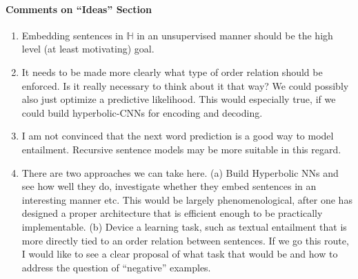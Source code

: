 \documentclass{article}
\begin{document}
\paragraph{Comments on ``Ideas'' Section}
\begin{enumerate}
\item Embedding sentences in $\mathbb H$ in an unsupervised manner should be the high level (at least motivating) goal.
\item It needs to be made more clearly what type of order relation should be enforced. Is it really necessary to think about it that way? We could possibly also just optimize a predictive likelihood. This would especially true, if we could build hyperbolic-CNNs for encoding and decoding. 
\item I am not convinced that the next word prediction is a good way to model entailment. Recursive sentence models \cite{socher2013recursive} may be more suitable in this regard. 
\item There are two approaches we can take here. (a) Build Hyperbolic NNs and see how well they do, investigate whether they embed sentences in an interesting manner etc. This would be largely phenomenological, after one has designed a proper architecture that is efficient enough to be practically implementable. (b) Device a learning task, such as textual entailment that is more directly tied to an order relation between sentences. If we go this route, I would like to see a clear proposal of what task that would be and how to address the question of ``negative'' examples.
\end{enumerate}



\end{document}
